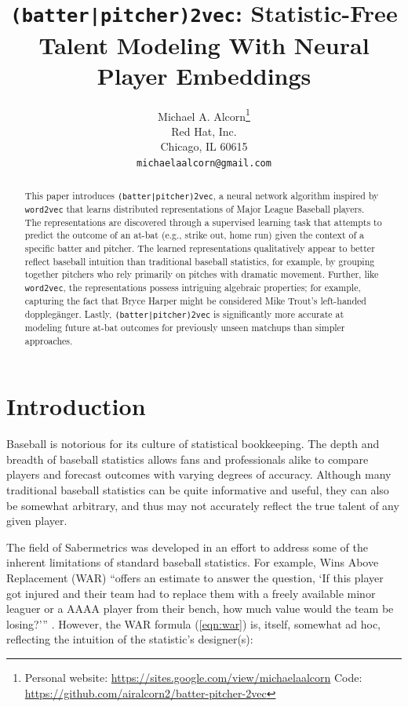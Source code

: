 \documentclass{article}
\title{\texttt{(batter|pitcher)2vec}: Statistic-Free Talent Modeling With Neural Player Embeddings}
\date{}
\author{
    Michael A. Alcorn\thanks
    {Personal website: \url{https://sites.google.com/view/michaelaalcorn}\newline
    \hspace*{1.8em}Code: \url{https://github.com/airalcorn2/batter-pitcher-2vec}} \\
    Red Hat, Inc.\\
    Chicago, IL 60615 \\
    \texttt{michaelaalcorn@gmail.com} \\
}
\begin{document}
\maketitle

\begin{abstract}

This paper introduces \texttt{(batter|pitcher)2vec}, a neural network algorithm inspired by \texttt{word2vec} that learns distributed representations of Major League Baseball players. The representations are discovered through a supervised learning task that attempts to predict the outcome of an at-bat (e.g., strike out, home run) given the context of a specific batter and pitcher. The learned representations qualitatively appear to better reflect baseball intuition than traditional baseball statistics, for example, by grouping together pitchers who rely primarily on pitches with dramatic movement. Further, like \texttt{word2vec}, the representations possess intriguing algebraic properties; for example, capturing the fact that Bryce Harper might be considered Mike Trout's left-handed dopplegänger. Lastly, \texttt{(batter|pitcher)2vec} is significantly more accurate at modeling future at-bat outcomes for previously unseen matchups than simpler approaches.

\end{abstract}

\section{Introduction}

Baseball is notorious for its culture of statistical bookkeeping. The depth and breadth of baseball statistics allows fans and professionals alike to compare players and forecast outcomes with varying degrees of accuracy. Although many traditional baseball statistics can be quite informative and useful, they can also be somewhat arbitrary, and thus may not accurately reflect the true talent of any given player.

The field of Sabermetrics was developed in an effort to address some of the inherent limitations of standard baseball statistics. For example, Wins Above Replacement (WAR) ``offers an estimate to answer the question, `If this player got injured and their team had to replace them with a freely available minor leaguer or a AAAA player from their bench, how much value would the team be losing?'\thinspace'' \parencite{WAR}. However, the WAR formula (\ref{eqn:war}) is, itself, somewhat ad hoc, reflecting the intuition of the statistic's designer(s):
\end{document}
